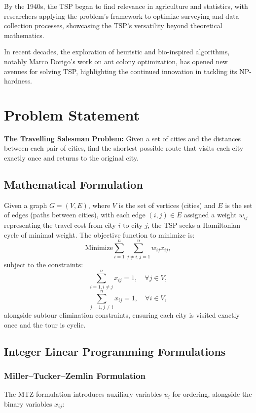By the 1940s, the TSP began to find relevance in agriculture and statistics, with researchers applying the problem's framework to optimize surveying and data collection processes, showcasing the TSP's versatility beyond theoretical mathematics.

In recent decades, the exploration of heuristic and bio-inspired algorithms, notably Marco Dorigo's work on ant colony optimization, has opened new avenues for solving TSP, highlighting the continued innovation in tackling its NP-hardness.

\section{Problem Statement}

\textbf{The Travelling Salesman Problem:} Given a set of cities and the distances between each pair of cities, find the shortest possible route that visits each city exactly once and returns to the original city.

\subsection{Mathematical Formulation}

Given a graph \(G = (V, E)\), where \(V\) is the set of vertices (cities) and \(E\) is the set of edges (paths between cities), with each edge \((i, j) \in E\) assigned a weight \(w_{ij}\) representing the travel cost from city \(i\) to city \(j\), the TSP seeks a Hamiltonian cycle of minimal weight.
The objective function to minimize is:
\[
	\text{Minimize} \sum_{i=1}^{n} \sum_{j \ne i, j=1}^{n} w_{ij} x_{ij},
\]
subject to the constraints:
\[
	\sum_{i=1, i \ne j}^{n} x_{ij} = 1, \quad \forall j \in V,
\]
\[
	\sum_{j=1, j \ne i}^{n} x_{ij} = 1, \quad \forall i \in V,
\]
alongside subtour elimination constraints, ensuring each city is visited exactly once and the tour is cyclic.

\subsection{Integer Linear Programming Formulations}

\subsubsection{Miller–Tucker–Zemlin Formulation}

The MTZ formulation introduces auxiliary variables \(u_i\) for ordering, alongside the binary variables \(x_{ij}\):

